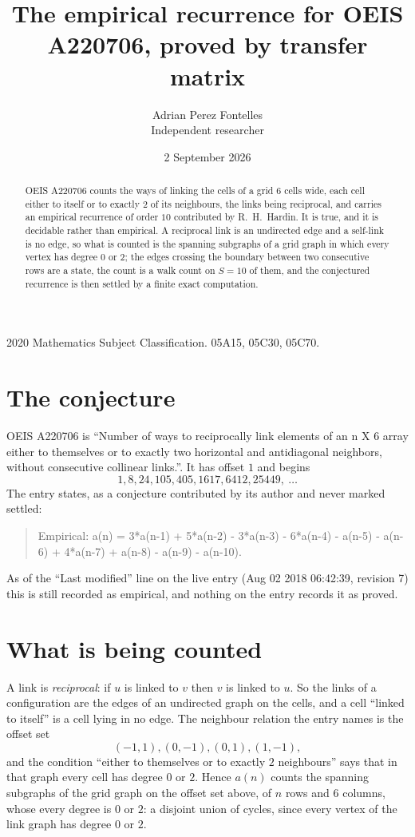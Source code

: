 \documentclass[11pt,a4paper]{article}
\title{The empirical recurrence for OEIS A220706, proved by transfer matrix}
\author{Adrian Perez Fontelles\\ \small Independent researcher}
\date{2 September 2026}
\theoremstyle{plain}
\theoremstyle{definition}
\begin{document}
\maketitle

\begin{abstract}
OEIS A220706 counts the ways of linking the cells of a grid $6$ cells wide, each cell either to
itself or to exactly $2$ of its neighbours, the links being reciprocal, and carries an
empirical recurrence of order $10$ contributed by R.~H.~Hardin. It is true, and it is
decidable rather than empirical. A reciprocal link is an undirected edge and a self-link is
no edge, so what is counted is the spanning subgraphs of a grid graph in which every vertex
has degree $0$ or $2$; the edges crossing the boundary between two consecutive rows are a
state, the count is a walk count on $S=10$ of them, and the conjectured recurrence is then
settled by a finite exact computation.
\end{abstract}

\noindent\small 2020 Mathematics Subject Classification. 05A15, 05C30, 05C70.\normalsize

\section{The conjecture}

OEIS A220706 is ``Number of ways to reciprocally link elements of an n X 6 array either to themselves or to exactly two horizontal and antidiagonal neighbors, without consecutive collinear links.''. It has offset $1$ and begins
\[
1, 8, 24, 105, 405, 1617, 6412, 25449,\ \dots
\]
The entry states, as a conjecture contributed by its author and never marked settled:
\begin{quote}
Empirical: a(n) = 3*a(n-1) + 5*a(n-2) - 3*a(n-3) - 6*a(n-4) - a(n-5) - a(n-6) + 4*a(n-7) + a(n-8) - a(n-9) - a(n-10).
\end{quote}
As of the ``Last modified'' line on the live entry (Aug 02 2018 06:42:39, revision 7) this is still
recorded as empirical, and nothing on the entry records it as proved.

\section{What is being counted}

A link is \emph{reciprocal}: if $u$ is linked to $v$ then $v$ is linked to $u$. So the links
of a configuration are the edges of an undirected graph on the cells, and a cell ``linked to
itself'' is a cell lying in no edge. The neighbour relation the entry names is the offset set
\[
(-1,1), (0,-1), (0,1), (1,-1),
\]
and the condition ``either to themselves or to exactly $2$ neighbours'' says that in that
graph every cell has degree $0$ or $2$. Hence $a(n)$ counts the spanning subgraphs of the
grid graph on the offset set above, of $n$ rows and $6$ columns,
whose every degree is $0$ or $2$: a disjoint union of cycles, since every vertex of the link graph has degree $0$ or $2$.
\end{document}

